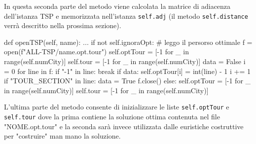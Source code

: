 \documentclass[a4paper,12pt]{report}
\begin{document}
In questa seconda parte del metodo viene calcolata la matrice di adiacenza dell'istanza TSP e memorizzata nell'istanza \lstinline!self.adj! (il metodo \lstinline!self.distance! verrà descritto nella prossima sezione).
\begin{python}
def openTSP(self, name):
  ...
  if not self.ignoraOpt:
      # leggo il persorso ottimale
      f = open(f"ALL-TSP/{name}.opt.tour")
      self.optTour = [-1 for _ in range(self.numCity)]
      self.tour = [-1 for _ in range(self.numCity)]
      data = False
      i = 0
      for line in f:
        if "-1" in line:
          break
        if data:
          self.optTour[i] = int(line) - 1
          i += 1
        if "TOUR_SECTION" in line:
          data = True
      f.close()
  else:
    self.optTour = [-1 for _ in range(self.numCity)]
    self.tour = [-1 for _ in range(self.numCity)]
\end{python}
L'ultima parte del metodo consente di inizializzare le liste  \lstinline!self.optTour! e \lstinline!self.tour! dove la prima contiene la soluzione ottima contenuta nel file "NOME.opt.tour" e la seconda sarà invece utilizzata dalle euristiche costruttive per "costruire" man mano la soluzione.
\end{document}
